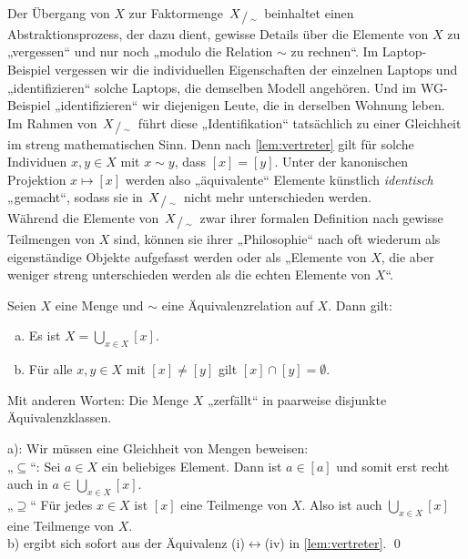 \begin{bem} \label{simphilo}
 Der Übergang von $X$ zur Faktormenge $\sfrac{X}{\sim}$ beinhaltet einen Abstraktionsprozess, der dazu dient, gewisse Details über die Elemente von $X$ zu „vergessen“ und nur noch „modulo die Relation $\sim$ zu rechnen“. Im Laptop-Beispiel vergessen wir die individuellen Eigenschaften der einzelnen Laptops und „identifizieren“ solche Laptops, die demselben Modell angehören. Und im WG-Beispiel „identifizieren“ wir diejenigen Leute, die in derselben Wohnung leben. \\
 Im Rahmen von $\sfrac{X}{\sim}$ führt diese „Identifikation“ tatsächlich zu einer Gleichheit im streng mathematischen Sinn. Denn nach \cref{lem:vertreter} gilt für solche Individuen $x,y\in X$ mit $x\sim y$, dass $[x]=[y]$. Unter der kanonischen Projektion $x\mapsto [x]$ werden also „äquivalente“ Elemente künstlich \emph{identisch} „gemacht“, sodass sie in $\sfrac{X}{\sim}$ nicht mehr unterschieden werden. \\
 Während die Elemente von $\sfrac{X}{\sim}$ zwar ihrer formalen Definition nach gewisse Teilmengen von $X$ sind, können sie ihrer „Philosophie“ nach oft wiederum als eigenständige Objekte aufgefasst werden oder als „Elemente von $X$, die aber weniger streng unterschieden werden als die echten Elemente von $X$“.
\end{bem}




\begin{sat}
	Seien $X$ eine Menge und $\sim$ eine Äquivalenzrelation auf $X$. Dann gilt:
\begin{enumerate}[a)]
 \item Es ist $X = \bigcup_{x\in X} [x]$.
 \item Für alle $x,y \in X$ mit $[x]\neq [y]$ gilt $[x] \cap [y] = \emptyset$.
\end{enumerate}
Mit anderen Worten: Die Menge $X$ „zerfällt“ in paarweise disjunkte Äquivalenzklassen.
\end{sat}



\begin{bew}
a): Wir müssen eine Gleichheit von Mengen beweisen: \\
„$\subseteq$“: Sei $a\in X$ ein beliebiges Element. Dann ist $a\in [a]$ und somit erst recht auch in $a\in\bigcup_{x\in X} [x]$. \\
„$\supseteq$“ Für jedes $x\in X$ ist $[x]$ eine Teilmenge von $X$. Also ist auch $\bigcup_{x\in X} [x]$ eine Teilmenge von $X$. \\[0.5em]
b) ergibt sich sofort aus der Äquivalenz (i)$\leftrightarrow$(iv) in \cref{lem:vertreter}. \qed
\end{bew}

